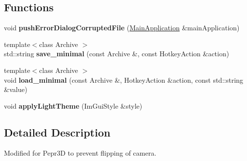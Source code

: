 \subsection*{Functions}
\begin{DoxyCompactItemize}
\item 
\mbox{\label{namespacepepr3d_a79317f48d39eac59ce95667b9e34dfff}} 
void {\bfseries push\+Error\+Dialog\+Corrupted\+File} (\mbox{\hyperlink{classpepr3d_1_1_main_application}{Main\+Application}} \&main\+Application)
\item 
\mbox{\label{namespacepepr3d_af6830e663c861adee937b0b975df163b}} 
{\footnotesize template$<$class Archive $>$ }\\std\+::string {\bfseries save\+\_\+minimal} (const Archive \&, const Hotkey\+Action \&action)
\item 
\mbox{\label{namespacepepr3d_a26eb8960b289e1666eb80f021e4fa885}} 
{\footnotesize template$<$class Archive $>$ }\\void {\bfseries load\+\_\+minimal} (const Archive \&, Hotkey\+Action \&action, const std\+::string \&value)
\item 
\mbox{\label{namespacepepr3d_a16036d11b930e7d9e9a4d7d285ad7b14}} 
void {\bfseries apply\+Light\+Theme} (Im\+Gui\+Style \&style)
\end{DoxyCompactItemize}


\subsection{Detailed Description}
Modified for Pepr3D to prevent flipping of camera. 